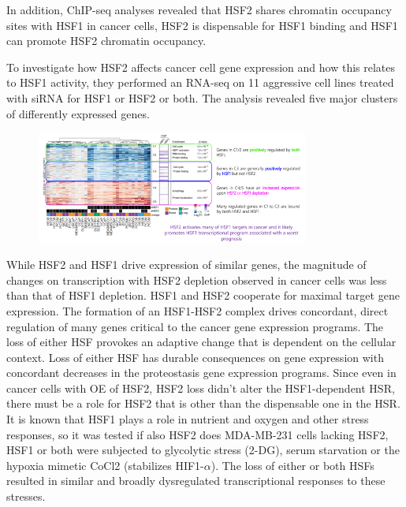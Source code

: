In addition, ChIP-seq analyses revealed that HSF2 shares chromatin occupancy sites with HSF1 in cancer cells, HSF2 is dispensable for HSF1 binding and HSF1 can promote HSF2 chromatin occupancy.

To investigate how HSF2 affects cancer cell gene expression and how this relates to HSF1 activity, they performed an RNA-seq on 11 aggressive
cell lines treated with siRNA for HSF1 or HSF2 or both. The analysis revealed five major clusters of differently expressed genes.

\begin{figure}
\centering
\includegraphics[width=0.8\textwidth]{../_resources/Screen_Shot_2022-12-20_at_11-45-23.png}
\caption{}
\end{figure}

While HSF2 and HSF1 drive expression of similar genes, the magnitude of changes on transcription with HSF2 depletion observed in cancer cells
was less than that of HSF1 depletion. HSF1 and HSF2 cooperate for maximal target gene expression. The formation of an HSF1-HSF2 complex drives concordant, direct regulation of many genes critical to the cancer gene expression programs.
The loss of either HSF provokes an adaptive change that is dependent on the cellular context. Loss of either HSF has durable consequences on gene expression with concordant decreases in the proteostasis gene expression programs. Since even in cancer cells with OE of HSF2, HSF2 loss didn’t alter the HSF1-dependent HSR, there must be a role for HSF2 that is other than the dispensable one in the HSR.
It is known that HSF1 plays a role in nutrient and oxygen and other stress responses, so it was tested if also HSF2 does MDA-MB-231 cells lacking HSF2, HSF1 or both were subjected to glycolytic stress (2-DG), serum starvation or the hypoxia mimetic CoCl2 (stabilizes HIF1-$\alpha$). The loss of either or both HSFs resulted in similar and broadly dysregulated transcriptional responses to these stresses.

